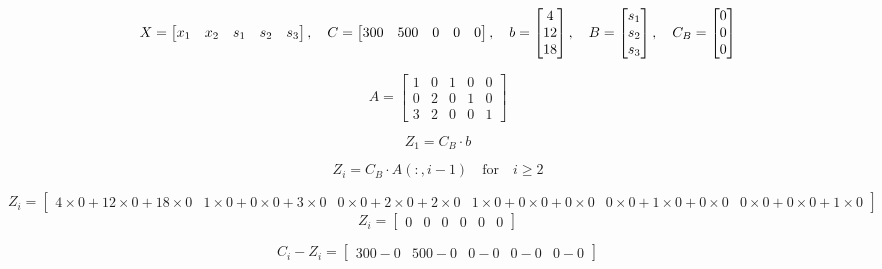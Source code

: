 \[
    X = \left[\begin{matrix} x_1 & x_2 & s_1 & s_2 & s_3 \end{matrix}\right], \hspace{0.35cm}
    C = \left[\begin{matrix} 300 & 500 & 0 & 0 & 0 \end{matrix}\right], \hspace{0.35cm}
b = \left[\begin{matrix} 4 \\ 12 \\ 18 \end{matrix}\right], \hspace{0.35cm}
B = \left[\begin{matrix} s_1 \\ s_2 \\ s_3 \end{matrix}\right], \hspace{0.35cm}
C_B = \left[\begin{matrix} 0 \\ 0 \\ 0 \end{matrix}\right]
\]


\vspace{1cm}
\[
    A = \left[\begin{matrix} 1 & 0 & 1 & 0 & 0\\
                             0 & 2 & 0 & 1 & 0\\
                             3 & 2 & 0 & 0 & 1\end{matrix}\right]
\]


\newpage
\[Z_1 = C_B \cdot b\] 


\[Z_i = C_B \cdot A(:, i-1) \quad \text{for} \quad i \geq 2\] 

\[Z_i =  \left[\begin{matrix} 4\times0 + 12\times0 + 18\times0 & 1\times0+0\times0+3\times0 & 0\times0 + 2\times0 + 2\times0 & 1\times0+0\times0+0\times0 & 0\times0+1\times0+0\times0 & 0\times0+0\times0+1\times0 \end{matrix}\right]\]
\[Z_i = \left[\begin{matrix} 0 & 0 & 0 & 0 & 0 & 0 \end{matrix}\right]\]

\vspace{0.5cm}

\[C_i-Z_i = \left[\begin{matrix} 300 - 0 & 500 - 0 & 0 - 0 & 0 - 0 & 0 - 0 \end{matrix}\right]\]

